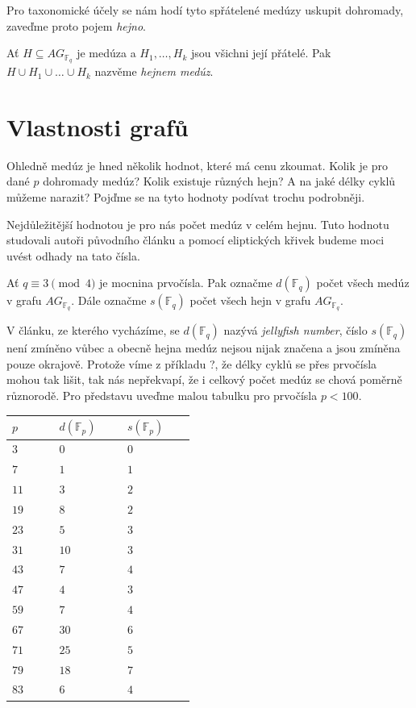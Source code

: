 \documentclass[12pt]{report}
\begin{document}
Pro taxonomické účely se nám hodí tyto spřátelené medúzy uskupit dohromady, zaveďme proto pojem \textit{hejno}.
\begin{definice}
Ať $H \subseteq AG_{\mathbb{F}_q}$ je medúza a $H_1,\dots,H_k$ jsou všichni její přátelé. Pak $H \cup H_1 \cup \dots \cup H_k$ nazvěme \textit{hejnem medúz}.
\end{definice}
 
 
\section{Vlastnosti grafů}

Ohledně medúz je hned několik hodnot, které má cenu zkoumat. Kolik je pro dané $p$ dohromady medúz? Kolik existuje různých hejn? A na jaké délky cyklů můžeme narazit? Pojďme se na tyto hodnoty podívat trochu podrobněji.

Nejdůležitější hodnotou je pro nás počet medúz v celém hejnu. Tuto hodnotu studovali autoři původního článku \cite{Meduza} a pomocí eliptických křivek budeme moci uvést odhady na tato čísla.

\begin{definice}
Ať $q \equiv 3 \pmod{4}$ je mocnina prvočísla. Pak označme $d(\mathbb{F}_q)$ počet všech medúz v grafu $AG_{\mathbb{F}_q}$. Dále označme $s(\mathbb{F}_q)$ počet všech hejn v grafu $AG_{\mathbb{F}_q}$.
\end{definice}

V článku, ze kterého vycházíme, se $d(\mathbb{F}_q)$ nazývá \textit{jellyfish number}, číslo $s(\mathbb{F}_q)$ není zmíněno vůbec a obecně hejna medúz nejsou nijak značena a jsou zmíněna pouze okrajově. Protože víme z příkladu ?, že délky cyklů se přes prvočísla mohou tak lišit, tak nás nepřekvapí, že i celkový počet medúz se chová poměrně různorodě. Pro představu uveďme malou tabulku pro prvočísla $p < 100$.

\begin{longtable}[H]{>{\raggedright\arraybackslash}p{0.15\linewidth}p{0.15\linewidth}p{0.15\linewidth}}
\toprule
$p$ & $d(\mathbb{F}_p)$ & $s(\mathbb{F}_p)$\\
\midrule
$3$ & \noindent $0$ & \noindent $0$\\
$7$ & \noindent $1$ & \noindent $1$\\
$11$ & \noindent $3$ & \noindent $2$\\
$19$ & \noindent $8$ & \noindent $2$\\
$23$ & \noindent $5$ & \noindent $3$\\
$31$ & \noindent $10$ & \noindent $3$\\
$43$ & \noindent $7$ & \noindent $4$\\
$47$ & \noindent $4$ & \noindent $3$\\
$59$ & \noindent $7$ & \noindent $4$\\
$67$ & \noindent $30$ & \noindent $6$\\
$71$ & \noindent $25$ & \noindent $5$\\
$79$ & \noindent $18$ & \noindent $7$\\
$83$ & \noindent $6$ & \noindent $4$\\
\bottomrule 
\end{longtable}
\end{document}
